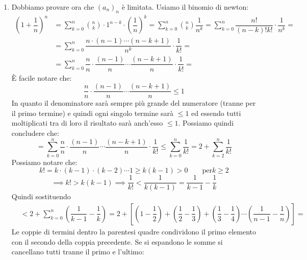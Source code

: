 {\begin{enumerate}
        \item Dobbiamo provare ora che $(a_n)_n$ è limitata. Usiamo il binomio di newton:
            \begin{align*}
                (1+\dfrac{1}{n})^n &= \sum_{k = 0}^{n} \binom{n}{k} \cdot 1^{n-k} \cdot \left(\dfrac{1}{n}\right)^k = \sum_{k = 0}^{n} \binom{n}{k}\dfrac{1}{n^k} = \sum_{k = 0}^{n} \dfrac{n!}{(n-k)!k!}\cdot\dfrac{1}{n^k}=\\
                &= \sum_{k = 0}^{n} \dfrac{n \cdot (n-1) \cdots (n-k+1)}{n^k} \cdot \dfrac{1}{k!} =\\
                &= \sum_{k = 0}^{n} \dfrac{n}{n} \cdot \dfrac{(n-1)}{n} \cdots \dfrac{(n-k+1)}{n} \cdot \dfrac{1}{k!} =
            \end{align*}
            È facile notare che:
            \begin{equation*}
                \dfrac{n}{n} \cdot \dfrac{(n-1)}{n} \cdots \dfrac{(n-k+1)}{n} \leq 1
            \end{equation*}
            In quanto il denominatore sarà sempre più grande del numeratore (tranne per il primo termine) e quindi ogni singolo termine sarà $\leq 1$ ed essendo tutti moltiplicati tra di loro il risultato sarà anch'esso $\leq 1$. Possiamo quindi concludere che:
            \begin{equation*}
                = \sum_{k = 0}^{n} \dfrac{n}{n} \cdot \dfrac{(n-1)}{n} \cdots \dfrac{(n-k+1)}{n} \cdot \dfrac{1}{k!} \leq \sum_{k = 0}^{n} \dfrac{1}{k!} = 2 + \sum_{k = 2}^{n} \dfrac{1}{k!}
            \end{equation*}
            Possiamo notare che:
            \begin{equation*}
                k! = k\cdot (k-1)\cdot (k-2) \cdots 1 \geq k (k-1) > 0 \qquad \text{per} k\geq 2
            \end{equation*}
            \begin{equation*}
                \implies k! > k(k-1) \implies \dfrac{1}{k!} < \dfrac{1}{k(k-1)} = \dfrac{1}{k-1} - \dfrac{1}{k}
            \end{equation*}
            Quindi sostituendo
            \begin{align*}
                &< 2 + \sum_{k = 0}^{n} \left(\dfrac{1}{k-1} - \dfrac{1}{k}\right) = 2 + \left[ \left(1-\dfrac{1}{2}\right) + \left(\dfrac{1}{2}-\dfrac{1}{3}\right) + \left(\dfrac{1}{3}-\dfrac{1}{4}\right) \cdots \left(\dfrac{1}{n-1}-\dfrac{1}{n}\right)\right]=
            \end{align*}
            Le coppie di termini dentro la parentesi quadre condividono il primo elemento con il secondo della coppia precedente. Se si espandono le somme si cancellano tutti tranne il primo e l'ultimo:

\end{enumerate}}
